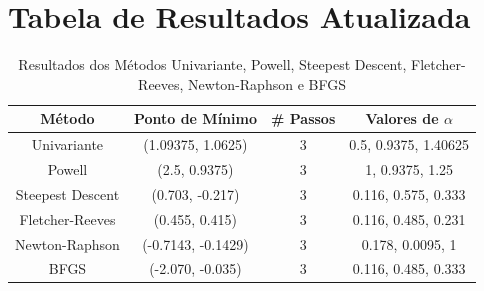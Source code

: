 \documentclass[a4paper, 12pt]{article}
\begin{document}
\section{Tabela de Resultados Atualizada}
\begin{table}[H]
\centering
\begin{tabular}{|c|c|c|c|}
\hline
\textbf{Método}       & \textbf{Ponto de Mínimo} & \textbf{\# Passos} & \textbf{Valores de \( \alpha \)} \\ \hline
Univariante           & (1.09375, 1.0625)       & 3                  & 0.5, 0.9375, 1.40625            \\ \hline
Powell                & (2.5, 0.9375)           & 3                  & 1, 0.9375, 1.25                \\ \hline
Steepest Descent      & (0.703, -0.217)         & 3                  & 0.116, 0.575, 0.333            \\ \hline
Fletcher-Reeves       & (0.455, 0.415)          & 3                  & 0.116, 0.485, 0.231            \\ \hline
Newton-Raphson      & (-0.7143, -0.1429)          & 3                  & 0.178, 0.0095, 1            \\ \hline
BFGS      &  (-2.070, -0.035)          & 3                  & 0.116, 0.485, 0.333           \\ \hline
\end{tabular}
\caption{Resultados dos Métodos Univariante, Powell, Steepest Descent, Fletcher-Reeves, Newton-Raphson e BFGS}
\end{table}



\newpage
    \nocite{*}
    
    
\end{document}
